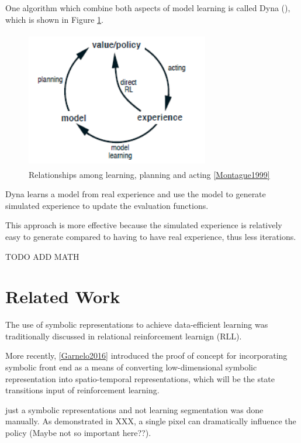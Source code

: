 \documentclass[12pt,twoside]{report}
\begin{document}
One algorithm which combine both aspects of model learning is called Dyna (\cite{Sutton1990}), which is shown in Figure \ref{dyna}.

\begin{figure}[!htb]
\centering
\includegraphics[width=8cm, height=6cm]{./figures/dyna}
\caption{Relationships among learning, planning and acting \ref{Montague1999}}
\label{dyna}
\end{figure}

Dyna learns a model from real experience and use the model to generate simulated experience to update the evaluation functions.

This approach is more effective because the simulated experience is relatively easy to generate compared to having to have real experience, thus less iterations.

TODO ADD MATH

\chapter{Related Work}
\label{related_work}

The use of symbolic representations to achieve data-efficient learning was traditionally discussed in relational reinforcement learnign (RLL).

More recently, \ref{Garnelo2016} introduced the proof of concept for incorporating symbolic front end as a means of converting low-dimensional symbolic representation into spatio-temporal representations, which will be the state transitions input of reinforcement learning.

just a symbolic representations and not learning
segmentation was done manually.
As demonstrated in XXX, a single pixel can dramatically influence the policy (Maybe not so important here??).
\end{document}
